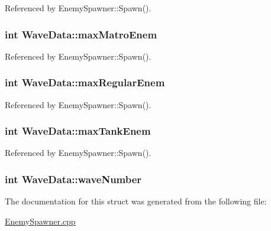Referenced by Enemy\-Spawner\-::\-Spawn().

\hypertarget{struct_wave_data_a147372a20a0e0cf2e92e36f9257eb280}{
\subsubsection[{max\-Matro\-Enem}]{\setlength{\rightskip}{0pt plus 5cm}int Wave\-Data\-::max\-Matro\-Enem}}\label{struct_wave_data_a147372a20a0e0cf2e92e36f9257eb280}


Referenced by Enemy\-Spawner\-::\-Spawn().

\hypertarget{struct_wave_data_a70b7b4b2a611aa961b4f7c7bbbbcafcb}{
\subsubsection[{max\-Regular\-Enem}]{\setlength{\rightskip}{0pt plus 5cm}int Wave\-Data\-::max\-Regular\-Enem}}\label{struct_wave_data_a70b7b4b2a611aa961b4f7c7bbbbcafcb}


Referenced by Enemy\-Spawner\-::\-Spawn().

\hypertarget{struct_wave_data_a85236ef7a2ac44e7364c65e106a341da}{
\subsubsection[{max\-Tank\-Enem}]{\setlength{\rightskip}{0pt plus 5cm}int Wave\-Data\-::max\-Tank\-Enem}}\label{struct_wave_data_a85236ef7a2ac44e7364c65e106a341da}


Referenced by Enemy\-Spawner\-::\-Spawn().

\hypertarget{struct_wave_data_a5bd42ea00e6a23546c2a952af1b8438b}{
\subsubsection[{wave\-Number}]{\setlength{\rightskip}{0pt plus 5cm}int Wave\-Data\-::wave\-Number}}\label{struct_wave_data_a5bd42ea00e6a23546c2a952af1b8438b}


The documentation for this struct was generated from the following file\-:\begin{DoxyCompactItemize}
\item 
\hyperlink{_enemy_spawner_8cpp}{Enemy\-Spawner.\-cpp}\end{DoxyCompactItemize}
